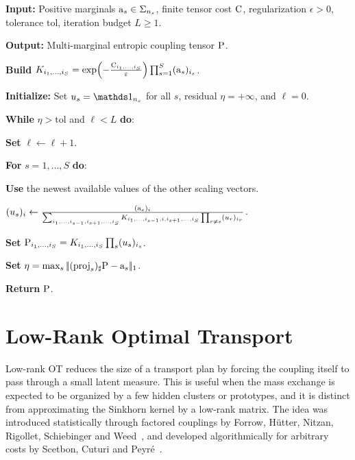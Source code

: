 \begin{alg}\label{alg:multimarginal-sinkhorn}
\textbf{Input:} Positive marginals $\a_s\in\simplex_{n_s}$, finite tensor cost $\C$, regularization $\epsilon>0$, tolerance $\mathrm{tol}$, iteration budget $L\geq1$.

\textbf{Output:} Multi-marginal entropic coupling tensor $\P$.

\textbf{Build}
\(K_{i_1,\ldots,i_S} = \exp\!\left(-\frac{\C_{i_1,\ldots,i_S}}{\epsilon}\right) \prod_{s=1}^S(\a_s)_{i_s}\).

\textbf{Initialize:} Set \(u_s=\ones_{n_s}\) for all $s$, residual \(\eta=+\infty\), and $\ell=0$.

\textbf{While} \(\eta>\mathrm{tol}\) and $\ell<L$ \textbf{do}:
\begin{algblock}
\textbf{Set} $\ell\leftarrow \ell+1$.

\textbf{For} $s=1,\ldots,S$ \textbf{do}:
\begin{algblock}
\textbf{Use} the newest available values of the other scaling vectors.

\((u_s)_i \leftarrow \frac{(\a_s)_i} { \sum_{i_1,\ldots,i_{s-1},i_{s+1},\ldots,i_S} K_{i_1,\ldots,i_{s-1},i,i_{s+1},\ldots,i_S} \prod_{r\neq s}(u_r)_{i_r}}\).
\end{algblock}

\textbf{Set} \(\P_{i_1,\ldots,i_S}=K_{i_1,\ldots,i_S}\prod_s (u_s)_{i_s}\).

\textbf{Set} \(\eta=\max_s\norm{(\mathrm{proj}_s)_\sharp \P-\a_s}_1\).
\end{algblock}
\algreturnskip
\textbf{Return} \(\P\).
\end{alg}


\section{Low-Rank Optimal Transport}
\label{sec-low-rank-ot}

Low-rank OT reduces the size of a transport plan by forcing the coupling itself to pass through a small latent measure. This is useful when the mass exchange is expected to be organized by a few hidden clusters or prototypes, and it is distinct from approximating the Sinkhorn kernel by a low-rank matrix. The idea was introduced statistically through factored couplings by Forrow, H\"utter, Nitzan, Rigollet, Schiebinger and Weed~\cite{forrow2019factored}, and developed algorithmically for arbitrary costs by Scetbon, Cuturi and Peyr\'e~\cite{scetbon2021lowrank}.

